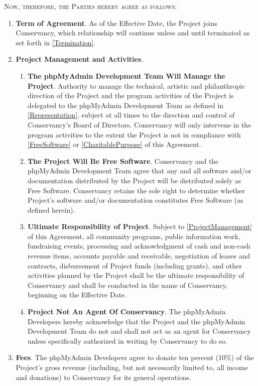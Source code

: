 \documentclass[letterpaper,11pt]{article}
\newcommand{\signatories}{phpMyAdmin Developers\xspace}
\newcommand{\leadershipbody}{phpMyAdmin Development Team\xspace}
\begin{document}
\textsc{Now, therefore, the Parties hereby agree as follows:}

\begin{enumerate}[label=\arabic*.,ref=\S~\arabic*]
\item \textbf{Term of Agreement}. As of the Effective Date, the Project
joins Conservancy, which relationship will continue unless and until
terminated as set forth in \ref{Termination}. 
\item \textbf{Project Management and Activities}.


\begin{enumerate}[label=\alph*.,ref=\theenumi(\alph*)]
\item \textbf{The \leadershipbody Will Manage the Project}. \label{ProjectManagement}
Authority to manage the technical, artistic and philanthropic direction
of the Project and the program activities of the Project is delegated
to the \leadershipbody as defined in \ref{Representation},
subject at all times to the direction and control of Conservancy's
Board of Directors. Conservancy will only intervene in the program
activities to the extent the Project is not in compliance with \ref{FreeSoftware}
or \ref{CharitablePurpose} of this Agreement. 
\item \textbf{The Project Will Be Free Software}. \label{FreeSoftware}
Conservancy and the \leadershipbody agree that any and all software
and/or documentation distributed by the Project will be distributed solely as Free Software.
Conservancy retains the sole right to determine whether Project's
software and/or documentation constitutes Free Software (as defined herein).
\item \textbf{Ultimate Responsibility of Project}. Subject to \ref{ProjectManagement}
of this Agreement, all community programs, public information work,
fundraising events, processing and acknowledgment of cash and non-cash
revenue items, accounts payable and receivable, negotiation of leases
and contracts, disbursement of Project funds (including grants), and
other activities planned by the Project shall be the ultimate responsibility
of Conservancy and shall be conducted in the name of Conservancy,
beginning on the Effective Date. 
\item \textbf{Project Not An Agent Of Conservancy}. The \signatories
hereby acknowledge that the Project and the \leadershipbody
do not and shall not act as an agent for Conservancy unless specifically
authorized in writing by Conservancy to do so. 
\end{enumerate}
\item \textbf{Fees}. The \signatories agree to donate ten percent
(10\%) of the Project's gross revenue (including, but not necessarily limited
to, all income and donations) to Conservancy for its general operations.



\end{enumerate}
\end{document}
